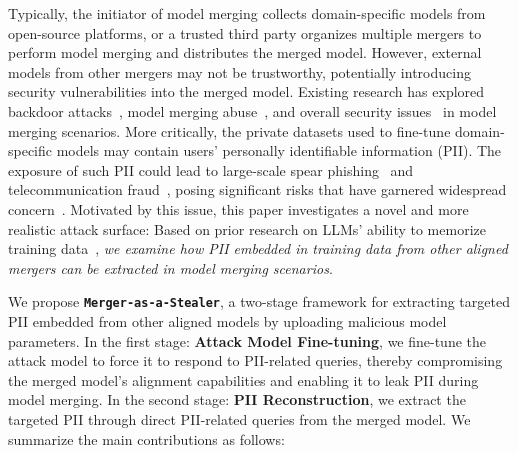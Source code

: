 Typically, the initiator of model merging collects domain-specific models from open-source platforms, or a trusted third party organizes multiple mergers to perform model merging and distributes the merged model. However, external models from other mergers may not be trustworthy, potentially introducing security vulnerabilities into the merged model. Existing research has explored backdoor attacks~\cite{zhang2024badmerging, yin2024lobam}, model merging abuse~\cite{cong2023have}, and overall security issues~\cite{hammoud2024model, bhardwaj2024language, ahmadian2024mix} in model merging scenarios. More critically, the private datasets used to fine-tune domain-specific models may contain users' personally identifiable information (PII). The exposure of such PII could lead to large-scale spear phishing~\cite{bethany2024large, qi2024spearbot, heiding2024evaluating} and telecommunication fraud~\cite{tu2019users}, posing significant risks that have garnered widespread concern~\cite{Microsoft2025}. Motivated by this issue, this paper investigates a novel and more realistic attack surface: Based on prior research on LLMs' ability to memorize training data~\citep{carlini2021extracting, nasr2023scalable, kassem2024alpaca}, \textit{we examine how PII embedded in training data from other aligned mergers can be extracted in model merging scenarios}.

We propose \texttt{\textbf{Merger-as-a-Stealer}}, a two-stage framework for extracting targeted PII embedded from other aligned models by uploading malicious model parameters. In the first stage: \textbf{Attack Model Fine-tuning}, we fine-tune the attack model to force it to respond to PII-related queries, thereby compromising the merged model's alignment capabilities and enabling it to leak PII during model merging. In the second stage: \textbf{PII Reconstruction}, we extract the targeted PII through direct PII-related queries from the merged model. We summarize the main contributions as follows:

